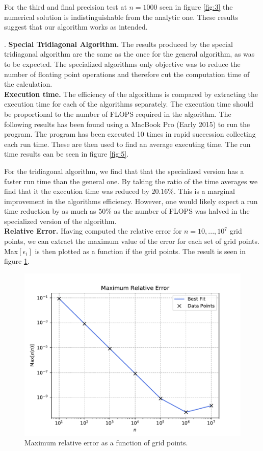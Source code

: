 \documentclass[a4paper,10pt]{article}
\begin{document}
For the third and final precision test at $n = 1000$ seen in figure \ref{fig:3} the numerical solution is indistinguishable from the analytic one. These results suggest that our algorithm works as intended.

\bigskip

. \textbf{Special Tridiagonal Algorithm.}
The results produced by the special tridiagonal algorithm are the same as the once for the general algorithm, as was to be expected. The specialized algorithms only objective was to reduce the number of floating point operations and therefore cut the computation time of the calculation. \\

 \textbf{Execution time.}
The efficiency of the algorithms is compared by extracting the execution time for each of the algorithms separately. The execution time should be proportional to the number of FLOPS required in the algorithm. The following results has been found using a MacBook Pro (Early 2015) to run the program. The program has been executed 10 times in rapid succession collecting each run time. These are then used to find an average executing time. The run time results can be seen in figure \ref{fig:5}. 

For the tridiagonal algorithm, we find that that the specialized version has a faster run time than the general one. By taking the ratio of the time averages we find that it the execution time was reduced by $20.16\%$. This is a marginal improvement in the algorithms efficiency. However, one would likely expect a run time reduction by as much as $50\%$ as the number of FLOPS was halved in the specialized version of the algorithm. \\

 \textbf{Relative Error.}
Having computed the relative error for $n = 10, ..., 10^7$ grid points, we can extract the maximum value of the error for each set of grid points. Max$[\epsilon_i]$ is then plotted as a function if the grid points. The result is seen in figure \ref{fig:4}.

\begin{figure}[h]
  \centering
  \includegraphics[width=0.9\linewidth]{figures/rel_error_plot.pdf}
  \caption{Maximum relative error as a function of grid points.}
  \label{fig:4}
\end{figure}
\end{document}
